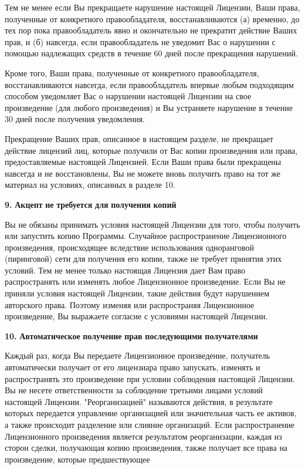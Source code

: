Тем не менее если Вы прекращаете нарушение настоящей Лицензии, Ваши права, полученные от конкретного правообладателя, восстанавливаются (а) временно, до тех пор пока правообладатель явно и окончательно не прекратит действие Ваших прав, и (б) навсегда, если правообладатель не уведомит Вас о нарушении с помощью надлежащих средств в течение 60 дней после прекращения нарушений.

Кроме того, Ваши права, полученные от конкретного правообладателя, восстанавливаются навсегда, если правообладатель впервые любым подходящим способом уведомляет Вас о нарушении настоящей Лицензии на свое произведение (для любого произведения) и Вы устраняете нарушение в течение 30 дней после получения уведомления.

Прекращение Ваших прав, описанное в настоящем разделе, не прекращает действие лицензий лиц, которые получили от Вас копии произведения или права, предоставляемые настоящей Лицензией. Если Ваши права были прекращены навсегда и не восстановлены, Вы не можете вновь получить право на тот же материал на условиях, описанных в разделе 10.

{\bfseries{9.}} {\bfseries{Акцепт}} {\bfseries{не}} {\bfseries{требуется}} {\bfseries{для}} {\bfseries{получения}} {\bfseries{копий}}

Вы не обязаны принимать условия настоящей Лицензии для того, чтобы получить или запустить копию Программы. Случайное распространение Лицензионного произведения, происходящее вследствие использования одноранговой (пиринговой) сети для получения его копии, также не требует принятия этих условий. Тем не менее только настоящая Лицензия дает Вам право распространять или изменять любое Лицензионное произведение. Если Вы не приняли условия настоящей Лицензии, такие действия будут нарушением авторского права. Поэтому изменяя или распространяя Лицензионное произведение, Вы выражаете согласие с условиями настоящей Лицензии.

{\bfseries{10.}} {\bfseries{Автоматическое}} {\bfseries{получение}} {\bfseries{прав}} {\bfseries{последующими}} {\bfseries{получателями}}

Каждый раз, когда Вы передаете Лицензионное произведение, получатель автоматически получает от его лицензиара право запускать, изменять и распространять это произведение при условии соблюдения настоящей Лицензии. Вы не несете ответственности за соблюдение третьими лицами условий настоящей Лицензии. "{}Реорганизацией"{} называются действия, в результате которых передается управление организацией или значительная часть ее активов, а также происходит разделение или слияние организаций. Если распространение Лицензионного произведения является результатом реорганизации, каждая из сторон сделки, получающая копию произведения, также получает все права на произведение, которые предшествующее


